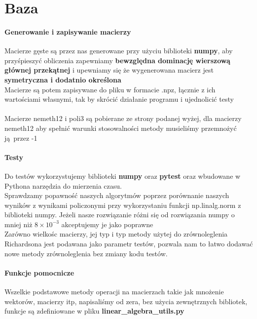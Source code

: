 \section{Baza} 
\paragraph{Generowanie i zapisywanie macierzy}
Macierze gęste są przez nas generowane przy użyciu biblioteki \textbf{numpy}, 
aby przyśpieszyć obliczenia zapewniamy \textbf{bewzględna dominację wierszową głównej przekątnej} i 
upewniamy się że wygenerowana macierz jest \textbf{symetryczna i dodatnio określona} \\ 
Macierze są potem zapisywane do pliku w 
formacie .npz, łącznie z ich wartościami własnymi, tak by 
skrócić działanie programu i ujednolicić testy 
\\ \null \\ 
Macierze nemeth12 i poli3 są pobierane ze strony podanej wyżej, dla macierzy nemeth12 aby spełnić
warunki stosowalności metody musieliśmy przemnożyć ją przez -1
\paragraph{Testy}
Do testów wykorzystujemy biblioteki \textbf{numpy} oraz \textbf{pytest} oraz wbudowane w Pythona 
narzędzia do mierzenia czasu. \\ 
Sprawdzamy popawność naszych algorytmów poprzez porównanie naszych wyników z wynikami policzonymi przy 
wykorzystaniu funkcji np.linalg.norm z biblioteki numpy. Jeżeli nasze rozwiązanie różni się od 
rozwiązania numpy o mniej niż $8 \times 10^{-3}$ akceptujemy je jako poprawne \\ 
Zarówno wielkośc macierzy, jej typ i typ metody użytej do zrównoleglenia Richardsona jest podawana jako 
parametr testów, pozwala nam to łatwo dodawać nowe metody zrównoleglenia bez zmiany kodu testów.
\paragraph{Funkcje pomocnicze}
Wszelkie podstawowe metody operacji na macierzach takie jak mnożenie wektorów, macierzy itp,
napisaliśmy od zera, bez użycia zewnętrznych bibliotek, funkcje są zdefiniowane w pliku 
\textbf{linear\_algebra\_utils.py}
